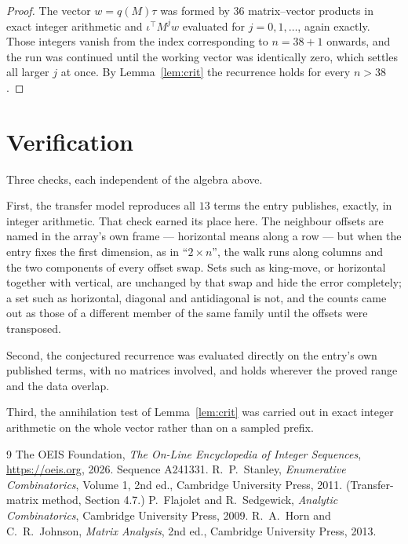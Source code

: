 \documentclass[11pt,a4paper]{article}
\theoremstyle{plain}
\theoremstyle{definition}
\begin{document}
\begin{proof}
The vector $w=q(M)\tau$ was formed by $36$ matrix--vector products in exact integer
arithmetic and $\iota^{\!\top}M^{j}w$ evaluated for $j=0,1,\dots$, again exactly. Those
integers vanish from the index corresponding to $n=38+1$ onwards, and the run was
continued until the working vector was identically zero, which settles all larger $j$ at once.
By Lemma~\ref{lem:crit} the recurrence holds for every $n>38$.
\end{proof}

\section{Verification}

Three checks, each independent of the algebra above.

First, the transfer model reproduces all $13$ terms the entry publishes, exactly, in
integer arithmetic. That check earned its place here. The neighbour offsets are named in the
array's own frame --- horizontal means along a row --- but when the entry fixes the first
dimension, as in ``$2\times n$'', the walk runs along columns and the two components of every
offset swap. Sets such as king-move, or horizontal together with vertical, are unchanged by
that swap and hide the error completely; a set such as horizontal, diagonal and antidiagonal
is not, and the counts came out as those of a different member of the same family until the
offsets were transposed.

Second, the conjectured recurrence was evaluated directly on the entry's own published terms,
with no matrices involved, and holds wherever the proved range and the data overlap.

Third, the annihilation test of Lemma~\ref{lem:crit} was carried out in exact integer
arithmetic on the whole vector rather than on a sampled prefix.

\begin{thebibliography}{9}
 The OEIS Foundation, \emph{The On-Line Encyclopedia of Integer
Sequences}, \url{https://oeis.org}, 2026. Sequence A241331.
 R.~P.~Stanley, \emph{Enumerative Combinatorics}, Volume 1, 2nd ed.,
Cambridge University Press, 2011. (Transfer-matrix method, Section 4.7.)
 P.~Flajolet and R.~Sedgewick, \emph{Analytic Combinatorics}, Cambridge
University Press, 2009.
 R.~A.~Horn and C.~R.~Johnson, \emph{Matrix Analysis}, 2nd ed., Cambridge
University Press, 2013.
\end{thebibliography}
\end{document}
